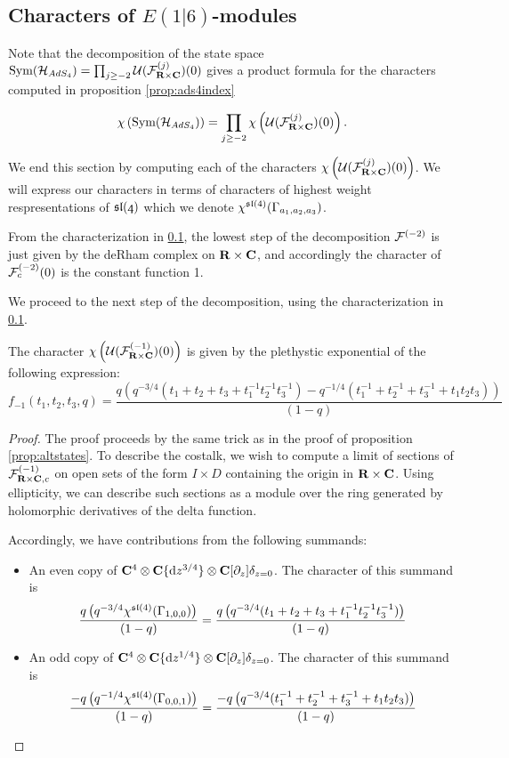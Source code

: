 \documentclass[../main.tex]{subfiles}
\begin{document}
\subsection{Characters of $E(1|6)$-modules}

Note that the decomposition of the state space $\text{Sym} (\mathcal{H}_{AdS_4} ) = \prod_{j\geq -2} \mathcal{U} (\mathcal{F}^{(j)} _{\mathbf{R}\times \mathbf{C}} )(0)$ gives a product formula for the characters computed in proposition \ref{prop:ads4index}


\[\chi \left (\text{Sym} (\mathcal{H}_{AdS_4} ) \right )= \prod_{j\geq -2} \chi \left ( \mathcal{U} (\mathcal{F}^{(j)} _{\mathbf{R}\times \mathbf{C}} )(0)\right ).\]

We end this section by computing each of the characters $\chi \left ( \mathcal{U} (\mathcal{F}^{(j)} _{\mathbf{R}\times \mathbf{C}} )(0)\right )$. We will express our characters in terms of characters of highest weight respresentations of $\mathfrak{sl(4)}$ which we denote $\chi^{\mathfrak{sl}(4)}(\Gamma_{a_1,a_2, a_3} )$.

\parsec[]
From the characterization in \ref{}, the lowest step of the decomposition $\mathcal{F}^{(-2)}$ is just given by the deRham complex on $\mathbf{R}\times \mathbf{C}$, and accordingly the character of $\mathcal{F}^{(-2)}_{c}(0)$ is the constant function 1.

\parsec[]
We proceed to the next step of the decomposition, using the characterization in \ref{}.

\begin{prop}
The character $\chi \left ( \mathcal{U}(\mathcal{F}_{\mathbf{R}\times \mathbf{C}}^{(-1)})(0)\right )$ is given by the plethystic exponential of the following expression:
\begin{equation}
f_{-1}(t_1, t_2, t_3, q) = \frac{q\left (q^{-3/4}(t_1+ t_2+t_3 + t_1^{-1} t_2^{-1} t_3^{-1} )-q^{-1/4}(t_1^{-1} + t_2^{-1}+t_3^{-1} + t_1t_2t_3)\right )}{(1-q)}
\end{equation}
\end{prop}
\begin{proof}
The proof proceeds by the same trick as in the proof of proposition \ref{prop:altstates}. To describe the costalk, we wish to compute a limit of sections of $\mathcal{F}^{(-1)}_{\mathbf{R}\times \mathbf{C},c}$ on open sets of the form $I\times D$ containing the origin in $\mathbf{R}\times \mathbf{C}$. Using ellipticity, we can describe such sections as a module over the ring generated by holomorphic derivatives of the delta function. 

Accordingly, we have contributions from the following summands:
\begin{itemize}
\item An even copy of $\mathbf{C}^4\otimes \mathbf{C}\{\mathrm{d} z^{3/4}\} \otimes \mathbf{C}[\partial_z]\delta_{z=0}$. The character of this summand is
\[
\frac{q\left (q^{-3/4}\chi^{\mathfrak{sl}(4)}(\Gamma_{1,0,0}) \right )}{(1-q)} =\frac{q\left (q^{-3/4}(t_1+ t_2+t_3 + t_1^{-1} t_2^{-1} t_3^{-1} )\right )}{(1-q)}
\]
\item An odd copy of $\mathbf{C}^4\otimes \mathbf{C}\{\mathrm{d} z^{1/4}\} \otimes \mathbf{C}[\partial_z]\delta_{z=0}$. The character of this summand is
\[
\frac{-q\left (q^{-1/4}\chi^{\mathfrak{sl}(4)}(\Gamma_{0,0,1}) \right )}{(1-q)} =\frac{-q\left (q^{-3/4}(t_1^{-1} + t_2^{-1} +t_3^{-1}  + t_1 t_2 t_3)\right )}{(1-q)}
\]
\end{itemize}
\end{proof}
\end{document}
